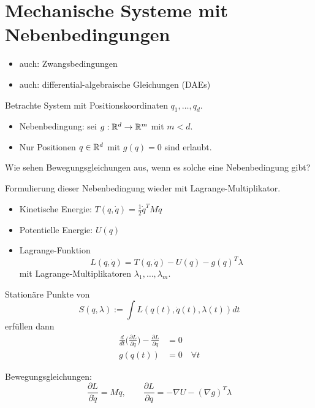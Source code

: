 \section{Mechanische Systeme mit Nebenbedingungen}

\begin{itemize}
	\item auch: Zwangsbedingungen
	\item auch: differential-algebraische Gleichungen (DAEs)
\end{itemize}

Betrachte System mit Positionskoordinaten $q_1, \dots, q_d$.
\begin{itemize}
	\item Nebenbedingung: sei $g: \mathbb R^d \to \mathbb R^m$ mit $m < d$.
	\item Nur Positionen $q \in \mathbb R^d$ mit $g(q) = 0$ sind erlaubt.
\end{itemize}

Wie sehen Bewegungsgleichungen aus, wenn es solche eine Nebenbedingung gibt?

Formulierung dieser Nebenbedingung wieder mit Lagrange-Multiplikator.

\begin{itemize}
	\item Kinetische Energie: $T(q, \dot q) = \frac12 \dot q^T M \dot q$
	\item Potentielle Energie: $U(q)$
	\item Lagrange-Funktion
	\begin{equation*}
		L(q, \dot q) = T(q, \dot q) - U(q) - g(q)^T \lambda
	\end{equation*}
	mit Lagrange-Multiplikatoren $\lambda_1, \dots, \lambda_m$.
\end{itemize}

Stationäre Punkte von
\begin{equation*}
	S(q, \lambda) := \int L(q(t), \dot q(t), \lambda(t)) dt
\end{equation*}
erfüllen dann
\begin{align*}
	\frac{d}{dt}\big( \frac{\partial L}{\partial \dot q} \big) - \frac{\partial L}{\partial q} & = 0 \\
	g(q(t)) & = 0 \quad \forall t
\end{align*}

Bewegungsgleichungen:
\begin{equation*}
	\frac{\partial L}{\partial \dot q} = M \dot q,
	\qquad
	\frac{\partial L}{\partial q} = - \nabla U - (\nabla g)^T \lambda
\end{equation*}

